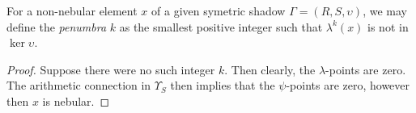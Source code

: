 
\begin{propdef}
  For a non-nebular element $x$ of a given symetric shadow $\Gamma = (R, S, \upsilon)$, we may define the \emph{penumbra} $k$ as the smallest positive integer such that $\lambda^k(x)$ is not in $\ker \upsilon$. 
\end{propdef}

\begin{proof}
  Suppose there were no such integer $k$. Then clearly, the $\lambda$-points are zero. The arithmetic connection in $\Upsilon_S$ then implies that the $\psi$-points are zero, however then $x$ is nebular.
\end{proof}


  
  
  
  


